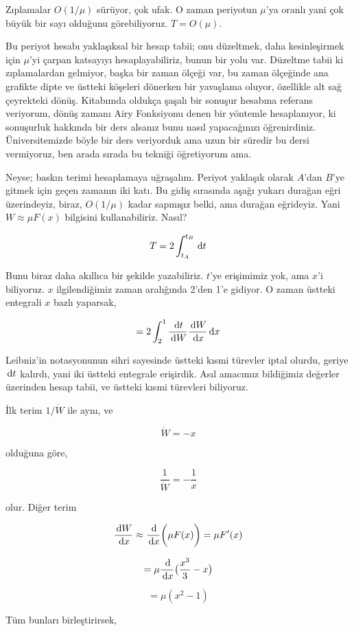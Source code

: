 \documentclass[12pt,fleqn]{article}\usepackage{../../common}
\begin{document}
Zıplamalar $O(1/\mu)$ sürüyor, çok ufak. O zaman periyotun $\mu$'ya oranlı yani çok
büyük bir sayı olduğunu görebiliyoruz. $T = O(\mu)$.

Bu periyot hesabı yaklaşıksal bir hesap tabii; onu düzeltmek, daha kesinleşirmek
için $\mu$'yi çarpan katsayıyı hesaplayabiliriz, bunun bir yolu var. Düzeltme
tabii ki zıplamalardan gelmiyor, başka bir zaman ölçeği var, bu zaman ölçeğinde
ana grafikte dipte ve üstteki köşeleri dönerken bir yavaşlama oluyor, özellikle
alt sağ çeyrekteki dönüş. Kitabımda oldukça şaşalı bir sonuşur hesabına referans
veriyorum, dönüş zamanı Airy Fonksiyonu denen bir yöntemle hesaplanıyor, ki
sonuşurluk hakkında bir ders alsanız bunu nasıl yapacağınızı
öğrenirdiniz. Üniversitemizde böyle bir ders veriyorduk ama uzun bir süredir bu
dersi vermiyoruz, ben arada sırada bu tekniği öğretiyorum ama.

Neyse; baskın terimi hesaplamaya uğraşalım. Periyot yaklaşık olarak $A$'dan
$B$'ye gitmek için geçen zamanın iki katı. Bu gidiş sırasında aşağı yukarı
durağan eğri üzerindeyiz, biraz, $O(1/\mu)$ kadar sapmışız belki, ama durağan
eğrideyiz. Yani $W \approx \mu F(x)$ bilgisini kullanabiliriz. Nasıl?

$$ T = 2 \int_{t_A}^{t_B} \,\mathrm{d} t $$

Bunu biraz daha akıllıca bir şekilde yazabiliriz. $t$'ye erişimimiz yok, ama
$x$'i biliyoruz. $x$ ilgilendiğimiz zaman aralığında 2'den 1'e gidiyor. O zaman
üstteki entegrali $x$ bazlı yaparsak,

$$ = 2\int_{2}^{1} \frac{\,\mathrm{d} t}{\,\mathrm{d} W} \frac{\,\mathrm{d} W}{\,\mathrm{d} x} \,\mathrm{d} x $$

Leibniz'in notasyonunun sihri sayesinde üstteki kısmi türevler iptal olurdu,
geriye $\,\mathrm{d} t$ kalırdı, yani iki üstteki entegrale erişirdik. Asıl amacımız
bildiğimiz değerler üzerinden hesap tabii, ve üstteki kısmi türevleri
biliyoruz.

İlk terim $1 / \dot{W}$ ile aynı, ve

$$ \dot{W} = -x $$

olduğuna göre,

$$ \frac{1}{\dot{W}} = -\frac{1}{x}$$

olur. Diğer terim

$$ \frac{\,\mathrm{d} W}{\,\mathrm{d} x} \approx
\frac{\,\mathrm{d}}{\,\mathrm{d} x} \bigg( \mu F(x) \bigg)
= \mu F'(x)
$$

$$ = \mu \frac{\,\mathrm{d}}{\,\mathrm{d} x} \big( \frac{x^3}{3} - x \big) $$

$$ = \mu (x^2 -1) $$

Tüm bunları birleştirirsek,
\end{document}
